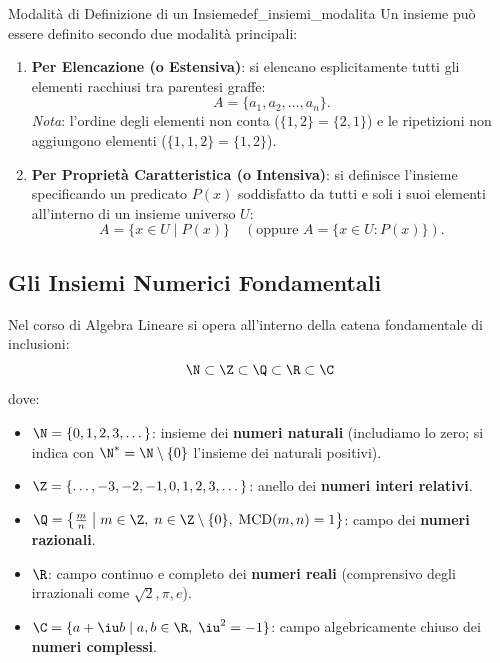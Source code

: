 \begin{definizione}{Modalità di Definizione di un Insieme}{def_insiemi_modalita}
Un insieme può essere definito secondo due modalità principali:
\begin{enumerate}
    \item \textbf{Per Elencazione (o Estensiva)}: si elencano esplicitamente tutti gli elementi racchiusi tra parentesi graffe:
    \begin{equation}
        A = \{a_1, a_2, \dots, a_n\}.
    \end{equation}
    \emph{Nota}: l'ordine degli elementi non conta ($\{1, 2\} = \{2, 1\}$) e le ripetizioni non aggiungono elementi ($\{1, 1, 2\} = \{1, 2\}$).
    \item \textbf{Per Proprietà Caratteristica (o Intensiva)}: si definisce l'insieme specificando un predicato $P(x)$ soddisfatto da tutti e soli i suoi elementi all'interno di un insieme universo $U$:
    \begin{equation}
        A = \{x \in U \mid P(x)\} \quad (\text{oppure } A = \{x \in U : P(x)\}).
    \end{equation}
\end{enumerate}
\end{definizione}

\subsection{Gli Insiemi Numerici Fondamentali}
Nel corso di Algebra Lineare si opera all'interno della catena fondamentale di inclusioni:
\begin{equation}
    \N \subset \Z \subset \Q \subset \R \subset \C
\end{equation}
dove:
\begin{itemize}
    \item $\N = \{0, 1, 2, 3, \dots\}$: insieme dei \textbf{numeri naturali} (includiamo lo zero; si indica con $\N^* = \N \setminus \{0\}$ l'insieme dei naturali positivi).
    \item $\Z = \{\dots, -3, -2, -1, 0, 1, 2, 3, \dots\}$: anello dei \textbf{numeri interi relativi}.
    \item $\Q = \left\{\frac{m}{n} \;\middle|\; m \in \Z, \; n \in \Z \setminus \{0\}, \; \operatorname{MCD}(m, n) = 1\right\}$: campo dei \textbf{numeri razionali}.
    \item $\R$: campo continuo e completo dei \textbf{numeri reali} (comprensivo degli irrazionali come $\sqrt{2}, \pi, e$).
    \item $\C = \{a + \iu b \mid a, b \in \R, \; \iu^2 = -1\}$: campo algebricamente chiuso dei \textbf{numeri complessi}.
\end{itemize}

